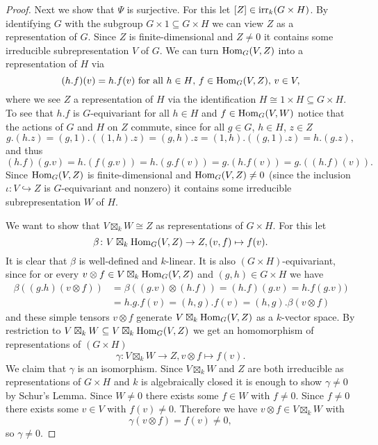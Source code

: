 \begin{proof}
 Next we show that $\Psi$ is surjective. For this let $[Z] \in \operatorname{irr}_k(G \times H)$. By identifying $G$ with the subgroup $G \times 1 \subseteq G \times H$ we can view $Z$ as a representation of $G$. Since $Z$ is finite-dimensional and $Z \neq 0$ it contains some irreducible subrepresentation $V$ of $G$. We can turn $\operatorname{Hom}_G(V, Z)$ into a representation of $H$ via
 \[
  (h.f)(v) = h.f(v) \text{ for all } h \in H\text{, }f \in \operatorname{Hom}_G(V, Z)\text{, }v \in V,
 \]
 where we see $Z$ a representation of $H$ via the identification $H \cong 1 \times H \subseteq G \times H$. To see that $h.f$ is $G$-equivariant for all $h \in H$ and $f \in \operatorname{Hom}_G(V,W)$ notice that the actions of $G$ and $H$ on $Z$ commute, since for all $g \in G$, $h \in H$, $z \in Z$
 \[
  g.(h.z) = (g,1).((1,h).z) = (g,h).z = (1,h).((g,1).z) = h.(g.z),
 \]
 and thus
 \[
  (h.f)(g.v) = h.(f(g.v)) = h.(g.f(v)) = g.(h.f(v)) = g.((h.f)(v)).
 \]
 Since $\operatorname{Hom}_G(V, Z)$ is finite-dimensional and $\operatorname{Hom}_G(V, Z) \neq 0$ (since the inclusion $\iota \colon V \hookrightarrow Z$ is $G$-equivariant and nonzero) it contains some irreducible subrepresentation $W$ of $H$.
 
 We want to show that $V \boxtimes_k W \cong Z$ as representations of $G \times H$. For this let
 \[
  \beta \colon V \boxtimes_k \operatorname{Hom}_G(V,Z) \to Z, (v, f) \mapsto f(v).
 \]
 It is clear that $\beta$ is well-defined and $k$-linear. It is also $(G \times H)$-equivariant, since for or every $v \otimes f \in V \boxtimes_k \operatorname{Hom}_G(V,Z)$ and $(g,h) \in G \times H$ we have
 \begin{align*}
  \beta((g.h)(v \otimes f))
  &= \beta((g.v) \otimes (h.f))
  = (h.f)(g.v)
  = h.f(g.v)) \\
  &= h.g.f(v)
  = (h,g).f(v)
  = (h,g).\beta(v \otimes f)
 \end{align*}
 and these simple tensors $v \otimes f$ generate $V \boxtimes_k \operatorname{Hom}_G(V,Z)$ as a $k$-vector space. By restriction to $V \boxtimes_k W \subseteq V \boxtimes_k \operatorname{Hom}_G(V,Z)$ we get an homomorphism of representations of $(G \times H)$
 \[
  \gamma \colon V \boxtimes_k W \to Z, v \otimes f \mapsto f(v).
 \]
 We claim that $\gamma$ is an isomorphism. Since $V \boxtimes_k W$ and $Z$ are both irreducible as representations of $G \times H$ and $k$ is algebraically closed it is enough to show $\gamma \neq 0$ by Schur’s Lemma. Since $W \neq 0$ there exists some $f \in W$ with $f \neq 0$. Since $f \neq 0$ there exists some $v \in V$ with $f(v) \neq 0$. Therefore we have $v \otimes f \in V \boxtimes_k W$ with
 \[
  \gamma(v \otimes f) = f(v) \neq 0,
 \]
 so $\gamma \neq 0$.
 

\end{proof}
